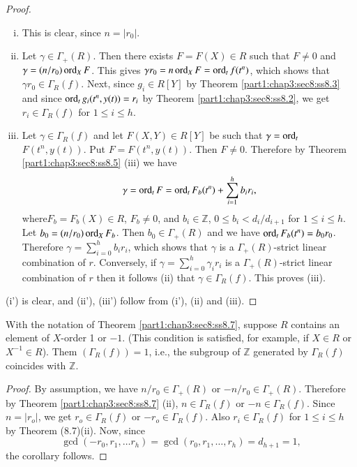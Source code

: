 \begin{proof}
  ~
\begin{enumerate}[(i)]
\item This is clear, since $n= |r_0|$.
\item Let $\gamma \in \Gamma_+ (R)$. Then there exists $F= F(X) \in R$ such that $F \neq 0$ and $\gamma = (n/r_0)\operatorname{ord}_X F$. This gives $\gamma r_0 = n \operatorname{ord}_X F = \operatorname{ord}_t f(t^n)$, which shows that $\gamma r_0 \in \Gamma_R (f)$. Next, since $g_i \in R [Y]$ by Theorem \ref{part1:chap3:sec8:ss8.3} and since $\operatorname{ord}_t g_i (t^n, y(t))=r_i$ by Theorem \ref{part1:chap3:sec8:ss8.2}, we get $r_i \in \Gamma_R (f)$ for $1 \leq i \leq h$.
\item Let $\gamma \in \Gamma_R (f)$ and let $F (X, Y) \in R [Y]$ be
  such that $\gamma = \operatorname{ord}_t$\break  $F(t^n, y(t))$. Put $F= F(t^n,
  y(t))$. Then $F\neq 0$. Therefore by Theorem
  \ref{part1:chap3:sec8:ss8.5} (iii) we have 
$$
\gamma = \operatorname{ord}_t F= \operatorname{ord}_t F_b (t^n)+ \sum^h_{i=1} b_i r_i,
$$
where\pageoriginale $F_b = F_b(X) \in R$, $F_b \neq 0$, and $b_i \in \mathbb{Z}$, $0 \leq b_i < d_i/d_{i+1}$ for $1 \leq i\leq h$. Let $b_0= (n/r_0) \operatorname{ord}_X F_b$. Then $b_0 \in \Gamma_+ (R)$ and we have $\operatorname{ord}_t F_b (t^n)= b_0 r_0$. Therefore $\gamma = \displaystyle{\sum^h_{i=0} b_i r_i}$, which shows that $\gamma$ is a $\Gamma_+ (R)$-strict linear combination of $r$. Conversely, if $\gamma = \displaystyle{\sum^h_{i=0} \gamma_i r_i}$ is a $\Gamma_+ (R)$-strict linear combination of $r$ then it follows (ii) that $\gamma \in \Gamma_R (f)$. This proves (iii).
\end{enumerate}
(i') is clear, and (ii'), (iii') follow from (i'), (ii) and (iii).
\end{proof}

\setcounter{thm}{7}
\begin{coro}\label{part1:chap3:sec8:coro8.8}
  With the notation of Theorem \ref{part1:chap3:sec8:ss8.7}, suppose $R$ contains an element of $X$-order 1 or $-1$. (This condition is satisfied, for example, if $X \in R$ or $X^{-1} \in R$). Them \gcd $(\Gamma_R (f))= 1$, i.e., the subgroup of $\mathbb{Z}$ generated by $\Gamma_R (f)$ coincides with $\mathbb{Z}$.  
\end{coro}

\begin{proof}
  By assumption, we have $n/r_0 \in \Gamma_+ (R)$ or $-n/r_0 \in \Gamma_+ (R)$. Therefore by Theorem \ref{part1:chap3:sec8:ss8.7} (ii), $n \in \Gamma_R(f)$ or $-n \in \Gamma_R (f)$. Since $n = |r_o|$, we get $r_o \in \Gamma_R(f)$ or $-r_o \in \Gamma_R(f)$. Also $r_i \in \Gamma_R(f)$ for $1 \leq i \leq h$ by Theorem (8.7)(ii). Now, since
$$
\gcd (-r_0, r_1, \ldots r_h)= \gcd (r_0, r_1, \ldots , r_h) = d_{h+1}=1,
$$ 
the corollary follows.
\end{proof}
